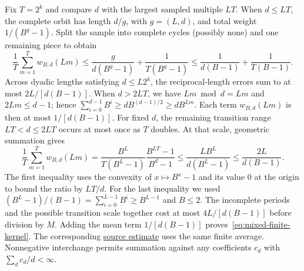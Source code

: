 \documentclass[11pt]{article}
\begin{document}
Fix $T=2^k$ and compare $d$ with the largest sampled multiple $LT$.
When $d\le LT$, the complete orbit has length $d/g$, with $g=(L,d)$,
and total weight $1/(B^g-1)$. Split the sample into complete cycles
(possibly none) and one remaining piece to obtain
\[
 \frac1T\sum_{m=1}^T w_{B,d}(Lm)
 \le\frac{g}{d(B^g-1)}+\frac1{T(B^g-1)}
 \le\frac1{d(B-1)}+\frac1{T(B-1)}.
\]
Across dyadic lengths satisfying $d\le L2^k$, the reciprocal-length
errors sum to at most $2L/[d(B-1)]$.
When $d>2LT$, we have $Lm\bmod d=Lm$ and $2Lm\le d-1$; hence
$\sum_{i=0}^{d-1}B^i\ge dB^{(d-1)/2}\ge dB^{Lm}$.
Each term $w_{B,d}(Lm)$ is then at most $1/[d(B-1)]$.
For fixed $d$, the remaining transition range $LT<d\le2LT$ occurs
at most once as $T$ doubles. At that scale, geometric summation gives
\[
 \frac1T\sum_{m=1}^T w_{B,d}(Lm)
 =\frac{B^L}{T(B^L-1)}\frac{B^{LT}-1}{B^d-1}
 \le\frac{LB^L}{d(B^L-1)}
 \le\frac{2L}{d(B-1)}.
\]
The first inequality uses the convexity of $x\mapsto B^x-1$ and its
value $0$ at the origin to bound the ratio by $LT/d$. For the last
inequality we used
$(B^L-1)/(B-1)=\sum_{i=0}^{L-1}B^i\ge B^{L-1}$ and $B\le2$.
The incomplete periods and the possible transition scale together
cost at most $4L/[d(B-1)]$ before division by $M$. Adding the mean
term $1/[d(B-1)]$ proves~\eqref{eq:mixed-finite-kernel}.
The corresponding \href{https://github.com/wcook04/plectis-erdos/blob/c91562bd574a387cde904481e609c7b4cacebb14/lean/ErdosProblems/Erdos257/PaperCompleteR8/DyadicKernel.lean\#L206}{source estimate} uses the same finite average.
Nonnegative interchange permits summation against any coefficients $c_d$
with $\sum_dc_d/d<\infty$.
\end{document}
